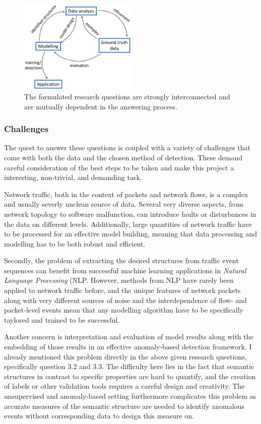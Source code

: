 \documentclass[a4paper,12pt,twoside]{report}
\begin{document}
\begin{figure}\label{RQs}
\centering
\includegraphics[width=0.5\textwidth]{images/RQ.png}
\caption{The formulated research questions are strongly interconnected and are mutually dependent in the answering process.}
\end{figure}


\subsubsection{Challenges}

The quest to answer these questions is coupled with a variety of challenges that come with both the data and the chosen method of detection. These demand careful consideration of the best steps to be taken and make this project a interesting, non-trivial, and demanding task. 

Network traffic, both in the context of packets and network flows, is a complex and usually severly unclean source of data. Several very diverse aspects, from network topology to software malfunction, can introduce faults or disturbances in the data on different levels. Additionally, large quantities of network traffic have to be processed for an effective model building, meaning that data processing and modelling has to be both robust and efficient.

Secondly, the problem of extracting the desired structures from traffic event sequences can benefit from successful machine learning applications in \textit{Natural Language Processing} (NLP. However, methods from NLP have rarely been applied to network traffic before, and the unique features of network packets along with very different sources of noise and the interdependence of flow- and packet-level events mean that any modelling algorithm have to be specifically taylored and trained to be successful. 

Another concern is interpretation and evaluation of model results along with the embedding of those results in an effective anomaly-based detection framework. I already mentioned this problem directly in the above given research questions, specifically question 3.2 and 3.3. The difficulty here lies in the fact that semantic structures in contrast to specific properties are hard to quantify, and the creation of labels or other validation tools requires a careful design and creativity. The unsupervised and anomaly-based setting furthermore complicates this problem as accurate measures of the semantic structure are needed to identify anomalous events without corresponding data to design this measure on.
\end{document}
